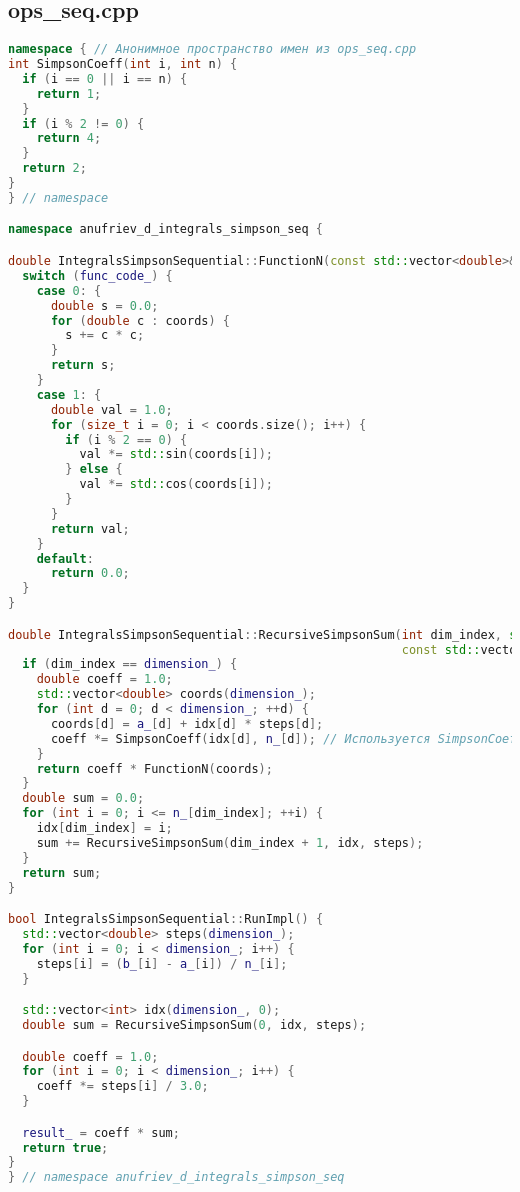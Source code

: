 \documentclass[a4paper,12pt]{article}
\begin{document}
\subsection{ops\_seq.cpp}
\begin{lstlisting}[language=C++, caption=Ключевые функции из ops\_seq.cpp, basicstyle=\ttfamily\tiny]
namespace { // Анонимное пространство имен из ops_seq.cpp
int SimpsonCoeff(int i, int n) {
  if (i == 0 || i == n) {
    return 1;
  }
  if (i % 2 != 0) {
    return 4;
  }
  return 2;
}
} // namespace

namespace anufriev_d_integrals_simpson_seq {

double IntegralsSimpsonSequential::FunctionN(const std::vector<double>& coords) const {
  switch (func_code_) {
    case 0: {
      double s = 0.0;
      for (double c : coords) {
        s += c * c;
      }
      return s;
    }
    case 1: {
      double val = 1.0;
      for (size_t i = 0; i < coords.size(); i++) {
        if (i % 2 == 0) {
          val *= std::sin(coords[i]);
        } else {
          val *= std::cos(coords[i]);
        }
      }
      return val;
    }
    default:
      return 0.0;
  }
}

double IntegralsSimpsonSequential::RecursiveSimpsonSum(int dim_index, std::vector<int>& idx,
                                                       const std::vector<double>& steps) const {
  if (dim_index == dimension_) {
    double coeff = 1.0;
    std::vector<double> coords(dimension_);
    for (int d = 0; d < dimension_; ++d) {
      coords[d] = a_[d] + idx[d] * steps[d];
      coeff *= SimpsonCoeff(idx[d], n_[d]); // Используется SimpsonCoeff из анонимного пространства
    }
    return coeff * FunctionN(coords);
  }
  double sum = 0.0;
  for (int i = 0; i <= n_[dim_index]; ++i) {
    idx[dim_index] = i;
    sum += RecursiveSimpsonSum(dim_index + 1, idx, steps);
  }
  return sum;
}

bool IntegralsSimpsonSequential::RunImpl() {
  std::vector<double> steps(dimension_);
  for (int i = 0; i < dimension_; i++) {
    steps[i] = (b_[i] - a_[i]) / n_[i];
  }

  std::vector<int> idx(dimension_, 0);
  double sum = RecursiveSimpsonSum(0, idx, steps);

  double coeff = 1.0;
  for (int i = 0; i < dimension_; i++) {
    coeff *= steps[i] / 3.0;
  }

  result_ = coeff * sum;
  return true;
}
} // namespace anufriev_d_integrals_simpson_seq
\end{lstlisting}
\end{document}
